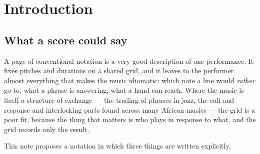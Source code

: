 \documentclass[11pt,a4paper]{article}
\theoremstyle{plain}
\theoremstyle{definition}
\theoremstyle{remark}
\begin{document}
\begin{abstract}
Results: every reduction is a note; a note cannot be fitted from alternatives
on both sides at once, which forces a single \emph{key} and one datum chosen a
note early; a voice is a key and a complete fan at a location that quotes its
own past, so unplayed alternatives are inert; unbounded voices need no
recursion former, because reflection supplies it and its communications are
null notes, rests of length zero, which are silent and take no time; the law of a voice is exactly the
normalised product of its clause's factors; independent voices have product law
and interleaving-invariant performances; and handing a line from one player to
another hands over its history, so the responder can read the call. The
traditional division of musician and instrument falls out of the polarities:
keys belong to instruments and touches to players, a $2n$-hands piano is a few
lines of process, synchronous output lets a player write a phrase, and an
instrument whose keys hold several timbres chooses its timbre at every touch
from how it is played. A
stdlib-only reference simulator checks the quantitative claims.
\end{abstract}

\tableofcontents

\section{Introduction}\label{sec:intro}

\subsection{What a score could say}

A page of conventional notation is a very good description of one performance.
It fixes pitches and durations on a shared grid, and it leaves to the performer
almost everything that makes the music idiomatic: which note a line would
\emph{rather} go to, what a phrase is answering, what a hand can reach. Where
the music is itself a structure of exchange --- the trading of phrases in jazz,
the call and response and interlocking parts found across many African musics
--- the grid is a poor fit, because the thing that matters is who plays in
response to what, and the grid records only the result.

This note proposes a notation in which three things are written explicitly.
\end{document}
